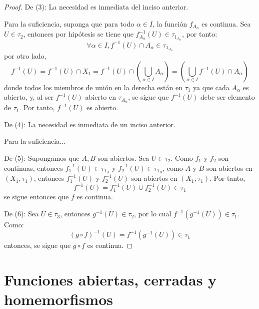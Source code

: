 \documentclass[12pt]{report}
\theoremstyle{largebreak}
\begin{document}
    \begin{proof}
        De (3): La necesidad es inmediata del inciso anterior.

        Para la suficiencia, suponga que para todo $\alpha\in I$, la función $f_{A_\alpha}$ es continua. Sea $U\in\tau_2$, entonces por hipótesis se tiene que $f_{A_\alpha}^{-1}(U)\in\tau_{1_{A_\alpha}}$, por tanto:
        \begin{equation*}
            \forall \alpha\in I, f^{-1}(U)\cap A_\alpha\in \tau_{1_{A_\alpha}}
        \end{equation*}
        por otro lado,
        \begin{equation*}
            f^{-1}(U)=f^{-1}(U)\cap X_1=f^{-1}(U)\cap\left(\bigcup_{\alpha\in I}A_\alpha \right)=\left(\bigcup_{\alpha\in I}f^{-1}(U)\cap A_\alpha \right)
        \end{equation*}
        donde todos los miembros de unión en la derecha están en $\tau_1$ ya que cada $A_\alpha$ es abierto, y, al ser $f^{-1}(U)$ abierto en $\tau_{A_\alpha}$, se sigue que $f^{-1}(U)$ debe ser elemento de $\tau_1$. Por tanto, $f^{-1}(U)$ es abierto.

        De (4): La necesidad es inmediata de un inciso anterior.

        Para la suficiencia... %

        De (5): Supongamos que $A,B$ son abiertos. Sea $U\in\tau_2$. Como $f_1$ y $f_2$ son continuas, entonces $f_1^{-1}(U)\in\tau_{1_A}$ y $f_2^{-1}(U)\in\tau_{1_B}$, como $A$ y $B$ son abiertos en $(X_1,\tau_1)$, entonces $f_1^{-1}(U)$ y $f_2^{-1}(U)$ son abiertos en $(X_1,\tau_1)$. Por tanto,
        \begin{equation*}
            f^{-1}(U)=f_1^{-1}(U)\cup f_2^{-1}(U)\in\tau_1
        \end{equation*}
        se sigue entonces que $f$ es continua.

        De (6): Sea $U\in\tau_3$, entonces $g^{-1}(U)\in \tau_2$, por lo cual $f^{-1}(g^{-1}(U))\in\tau_1$. Como:
        \begin{equation*}
            (g\circ f)^{-1}(U)=f^{-1}(g^{-1}(U))\in\tau_1
        \end{equation*}
        entonces, se sigue que $g\circ f$ es continua.
    \end{proof}

    \section{Funciones abiertas, cerradas y homemorfismos}
\end{document}
